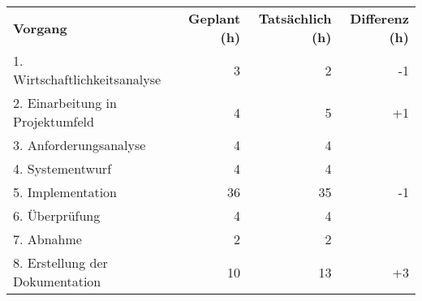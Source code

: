 \begin{tabularx}{\textwidth}{Xrrr}
    \rowcolor{KVGruen}\textbf{Vorgang} & \textbf{Geplant (h)} & \textbf{Tatsächlich (h)} & \textbf{Differenz (h)} \\
    1. Wirtschaftlichkeitsanalyse & 3 & 2 & -1 \\
    \rowcolor{KVGrau}2. Einarbeitung in Projektumfeld & 4   & 5   & +1 \\
    3. Anforderungsanalyse & 4 & 4 & \\
    \rowcolor{KVGrau}4. Systementwurf & 4   & 4   &  \\
    5. Implementation & 36 & 35 & -1 \\
    \rowcolor{KVGrau}6. Überprüfung & 4   & 4  &  \\
    7. Abnahme & 2 & 2 &  \\
    \rowcolor{KVGrau}8. Erstellung der Dokumentation & 10  & 13  & +3 \\
\end{tabularx}
